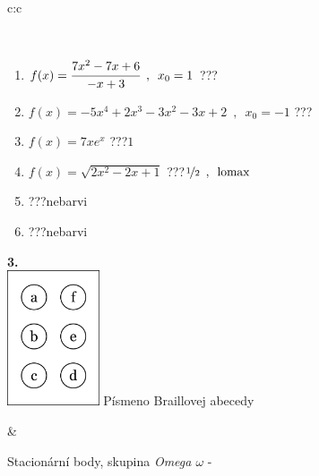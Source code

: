 \documentclass[10pt]{report}
\begin{document}
\begin{tabular}{c:c}
\begin{minipage}[c][104.5mm][t]{0.5\linewidth}
\begin{center}
\begin{minipage}{0.95\linewidth}
\begin{center}
\end{center}
\end{minipage}
\\[1mm]
\begin{minipage}{0.79\linewidth}
\begin{center}
\begin{varwidth}{\linewidth}
\begin{enumerate}
\normalsize
\item $f(x)=\cfrac{7x^2-7x+6}{-x+3}\enspace , \enspace x_0=1$\quad \dotfill\; ???\;\dotfill \quad {}
\item $f(x)=-5x^4+2x^3-3x^2-3x+2\enspace , \enspace x_0=-1$\quad \dotfill\; ???\;\dotfill \quad {}
\item $f(x)=7xe^{x}$\quad \dotfill\; ???\;\dotfill \quad $1$
\item $f(x)=\sqrt{2x^2-2x+1}$\quad \dotfill\; ???\;\dotfill \quad $\nicefrac{1}{2}\enspace , \enspace\mathrm{lomax}$
\item \quad \dotfill\; ???\;\dotfill \quad nebarvi
\item \quad \dotfill\; ???\;\dotfill \quad nebarvi
\end{enumerate}
\end{varwidth}
\end{center}
\end{minipage}
\begin{minipage}{0.20\linewidth}
\begin{center}
{\Huge\bfseries 3.} \\[2mm]
\includegraphics[height=40mm]{../images/braille.png}
{\small Písmeno Braillovej abecedy}
\end{center}
\end{minipage}
\end{center}
\end{minipage}
&
\begin{minipage}[c][104.5mm][t]{0.5\linewidth}
\begin{center}
\vspace{7mm}
{\huge Stacionární body, skupina \textit{Omega $\omega$} -}\\[5mm]

\end{center}
\end{minipage}
\end{tabular}
\end{document}
